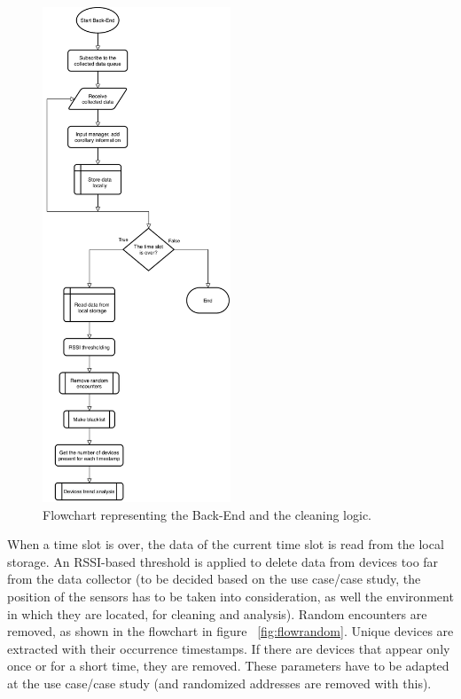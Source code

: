 \begin{figure}[h]
\centering 
\includegraphics[width=0.5\textwidth]{images/flowcleaner} 
\caption{Flowchart representing the Back-End and the cleaning logic.}
\label{fig:flowcleaner}
\end{figure}

When a time slot is over, the data of the current time slot is read from the local storage. An RSSI-based threshold is applied to delete data from devices too far from the data collector (to be decided based on the use case/case study, the position of the sensors has to be taken into consideration, as well the environment in which they are located, for cleaning and analysis). Random encounters are removed, as shown in the flowchart in figure ~\ref{fig:flowrandom}. Unique devices are extracted with their occurrence timestamps. If there are devices that appear only once or for a short time,  they are removed. These parameters have to be adapted at the use case/case study (and randomized addresses are removed with this).

